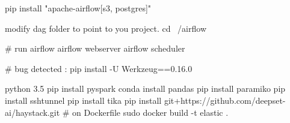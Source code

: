 pip install "apache-airflow[s3, postgres]"

modify dag folder to point to you project.
cd ~/airflow

# run airflow
airflow webserver
airflow scheduler

# bug detected :
pip install -U Werkzeug==0.16.0


python 3.5
pip install pyspark 
conda install pandas 
pip install paramiko
pip install sshtunnel
pip install tika
pip install git+https://github.com/deepset-ai/haystack.git
# on Dockerfile
sudo docker build -t elastic .